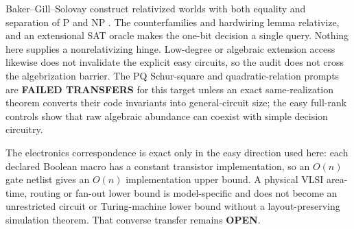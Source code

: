 \documentclass[11pt]{article}
\begin{document}
Baker--Gill--Solovay construct relativized worlds with both equality and
separation of P and NP \cite{bgs}.  The counterfamilies and hardwiring lemma
relativize, and an extensional SAT oracle makes the one-bit decision a single
query.  Nothing here supplies a nonrelativizing hinge.  Low-degree or
algebraic extension access likewise does not invalidate the explicit easy
circuits, so the audit does not cross the algebrization barrier.  The PQ
Schur-square and quadratic-relation prompts are \textbf{FAILED TRANSFERS}
for this target unless an exact same-realization theorem converts their
code invariants into general-circuit size; the easy full-rank controls show
that raw algebraic abundance can coexist with simple decision circuitry.

The electronics correspondence is exact only in the easy direction used
here: each declared Boolean macro has a constant transistor implementation,
so an $O(n)$ gate netlist gives an $O(n)$ implementation upper bound.  A
physical VLSI area-time, routing or fan-out lower bound is model-specific and
does not become an unrestricted circuit or Turing-machine lower bound without
a layout-preserving simulation theorem.  That converse transfer remains
\textbf{OPEN}.
\end{document}
